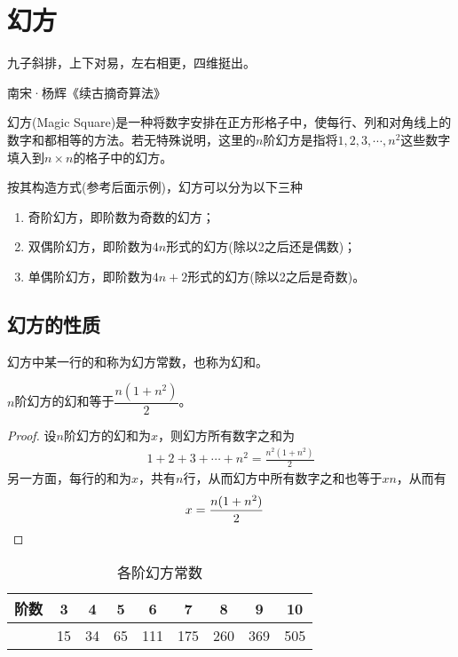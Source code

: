 \chapter{幻方}
\label{chap:magic-square}

\epigraph{九子斜排，上下对易，左右相更，四维挺出。}{南宋·杨辉《续古摘奇算法》}

幻方(Magic Square)是一种将数字安排在正方形格子中，使每行、列和对角线上的数字和都相等的方法。若无特殊说明，这里的$n$阶幻方是指将$1,2,3,\cdots,n^2$这些数字填入到$n\times n$的格子中的幻方。

按其构造方式(参考后面示例)，幻方可以分为以下三种
\begin{enumerate}
\item 奇阶幻方，即阶数为奇数的幻方；
\item 双偶阶幻方，即阶数为$4n$形式的幻方(除以2之后还是偶数)；
\item 单偶阶幻方，即阶数为$4n+2$形式的幻方(除以2之后是奇数)。
\end{enumerate}

\section{幻方的性质}
\label{sec:magic-square-properties}

\begin{definition}[幻方常数]
  幻方中某一行的和称为幻方常数，也称为幻和。
\end{definition}

\begin{theorem}
  $n$阶幻方的幻和等于$\dfrac{n(1+n^2)}2$。
\end{theorem}
\begin{proof}
  设$n$阶幻方的幻和为$x$，则幻方所有数字之和为
  \begin{align*}
    1+2+3+\cdots+n^2=\frac{n^2(1+n^2)}{2}
  \end{align*}
  另一方面，每行的和为$x$，共有$n$行，从而幻方中所有数字之和也等于$xn$，从而有
  \begin{align*}
    x=\frac{n(1+n^2)}{2}&\qedhere
  \end{align*}
\end{proof}

\begin{table}[htbp]
  \centering
  \begin{tabular}{c|cccccccc}
    \toprule[2pt]
    阶数 & 3  & 4  & 5  & 6   & 7   & 8   & 9   & 10 \\\hline
         & 15 & 34 & 65 & 111 & 175 & 260 & 369 & 505\\
    \bottomrule[2pt]
  \end{tabular}
  \caption{各阶幻方常数}
  \label{tab:constant-of-some-magic-squares}
\end{table}

